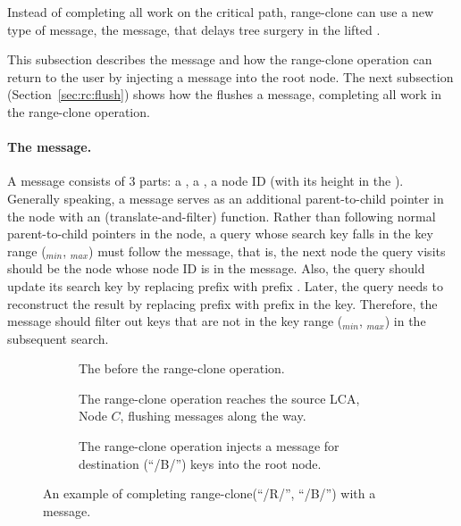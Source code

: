 Instead of completing all work on the critical path, range-clone can use a
new type of message, the \goto message, that delays tree surgery
in the lifted \bedag.

This subsection describes the \goto message and how the range-clone operation
can return to the user by injecting a \goto message into the root node.
The next subsection (Section~\ref{sec:rc:flush}) shows how the \bet flushes
a \goto message,
completing all work in the range-clone operation.

\paragraph{The \goto message.}
A \goto message consists of 3 parts: a \dpre, a \spre, a node ID
(with its height in the \bedag).
Generally speaking, a \goto message serves as an additional parent-to-child
pointer in the \bet node with an \xf (translate-and-filter) function.
Rather than following normal parent-to-child pointers in the node,
a query whose search key falls in the key range (\dpre$_{min}$, \dpre$_{max}$)
must follow the \goto message, that is, the next node the query visits
should be the node whose node ID is in the \goto message.
Also, the query should update its search key by replacing prefix \dpre with
prefix \spre.
Later, the query needs to reconstruct the result by replacing prefix \spre
with prefix \dpre in the key.
Therefore, the \goto message should filter out keys that are not in the
key range (\spre$_{min}$, \spre$_{max}$) in the subsequent search.

\begin{figure}
    \begin{subfigure}{\textwidth}
        \centering
        
        \caption{\label{subfig:goto-1} The \bet before the range-clone operation.}
    \end{subfigure}
    \begin{subfigure}{\textwidth}
        \centering
        
        \caption{\label{subfig:goto-2}
            The range-clone operation reaches the source LCA, Node $C$,
            flushing messages along the way.}
    \end{subfigure}
    \begin{subfigure}{\textwidth}
        \centering
        
        \caption{\label{subfig:goto-3} The range-clone operation injects a \goto message
            for destination (``/B/'') keys into the root node.}
    \end{subfigure}
    \caption[A range-clone example with a \goto message]{\label{fig:goto}
        An example of completing range-clone(``/R/'', ``/B/'') with a \goto message.}
\end{figure}

